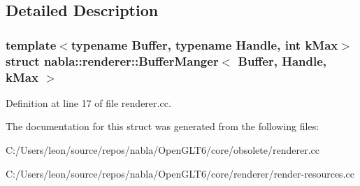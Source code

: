 \subsection{Detailed Description}
\subsubsection*{template$<$typename Buffer, typename Handle, int k\+Max$>$\newline
struct nabla\+::renderer\+::\+Buffer\+Manger$<$ Buffer, Handle, k\+Max $>$}



Definition at line 17 of file renderer.\+cc.



The documentation for this struct was generated from the following files\+:\begin{DoxyCompactItemize}
\item 
C\+:/\+Users/leon/source/repos/nabla/\+Open\+G\+L\+T6/core/obsolete/renderer.\+cc\item 
C\+:/\+Users/leon/source/repos/nabla/\+Open\+G\+L\+T6/core/renderer/render-\/resources.\+cc\end{DoxyCompactItemize}
